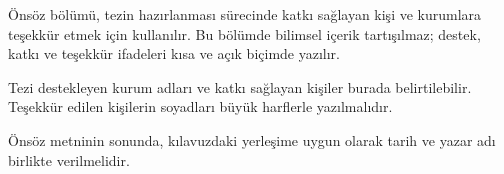 Önsöz bölümü, tezin hazırlanması sürecinde katkı sağlayan
kişi ve kurumlara teşekkür etmek için kullanılır. Bu
bölümde bilimsel içerik tartışılmaz; destek, katkı ve
teşekkür ifadeleri kısa ve açık biçimde yazılır.

Tezi destekleyen kurum adları ve katkı sağlayan kişiler burada
belirtilebilir. Teşekkür edilen kişilerin soyadları büyük
harflerle yazılmalıdır.

Önsöz metninin sonunda, kılavuzdaki yerleşime uygun olarak tarih ve
yazar adı birlikte verilmelidir.
